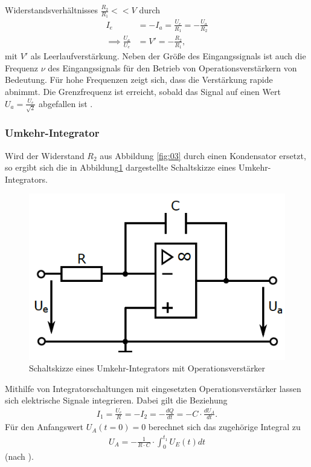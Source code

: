 Widerstandsverhältnisses $\frac{R_2}{R_1} << V$ durch \\
\begin{align}
  I_e &= - I_a = \frac{U_e}{R_1} = - \frac{U_a}{R_2} \\
  \implies \frac{U_a}{U_e} &= V' = -\frac{R_2}{R_1},
  \label{eqn:05}
\end{align}
\noindent mit $V'$ als Leerlaufverstärkung. Neben der Größe des Eingangssignals
ist auch die Frequenz $\nu$ des Eingangssignals für den Betrieb von
Operationsverstärkern von Bedeutung. Für hohe Frequenzen zeigt sich, dass die
Verstärkung rapide abnimmt. Die Grenzfrequenz ist erreicht, sobald das
Signal auf einen Wert $U_a = \frac{U_e}{\sqrt{2}}$ abgefallen ist \cite{federau, sample}.
\subsubsection{Umkehr-Integrator}
\noindent Wird der Widerstand $R_2$ aus Abbildung \ref{fig:03} durch einen
Kondensator ersetzt, so ergibt sich die in Abbildung\ref{fig:04} dargestellte
Schaltskizze eines Umkehr-Integrators. \\
\FloatBarrier
\begin{figure}
  \centering
  \includegraphics{ressources/figure_04.png}
  \caption{Schaltskizze eines Umkehr-Integrators mit Operationsverstärker \cite{sample}}
  \label{fig:04}
\end{figure}
\FloatBarrier
\noindent Mithilfe von Integratorschaltungen mit eingesetzten
Operationsverstärker lassen sich elektrische Signale integrieren. Dabei gilt die
Beziehung
\begin{align}
  I_1 = \frac{U_e}{R} = - I_2 = - \frac{dQ}{dt} = - C \cdot \frac{d U_A}{dt}.
  \label{eqn:06}
\end{align}
\noindent Für den Anfangswert $U_A(t=0) = 0$ berechnet sich das zugehörige
Integral zu
\begin{align}
  U_A = - \frac{1}{R \cdot C} \cdot \int_0^{t_1} U_E(t) dt
  \label{eqn:07}
\end{align}
\noindent (nach \cite{muenster}).
